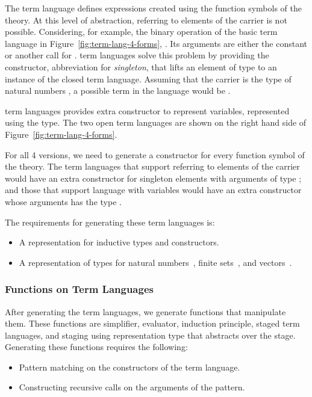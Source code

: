 The  term language defines expressions created using the function symbols of the theory. At this level of abstraction, referring to elements of the carrier is not possible.
Considering, for example, the binary operation of the basic  term language in Figure~\ref{fig:term-lang-4-forms}, . Its arguments are either the constant  or another call for . 
 term languages solve this problem by providing the  constructor, abbreviation for \emph{singleton}, that lifts an element of type  to an instance of the closed term language. Assuming that the carrier is the type of natural numbers , a possible term in the language would be . 

 term languages provides extra constructor to represent variables, represented using the  type. The two open term languages are shown on the right hand side of Figure~\ref{fig:term-lang-4-forms}.  

For all 4 versions, we need to generate a constructor for every function symbol of the theory. The term languages that support referring to elements of the carrier would have an extra constructor for singleton elements with arguments of type ; and those that support language with variables would have an extra constructor whose arguments has the type . 

The requirements for generating these term languages is: 
\begin{itemize}
\item A representation for inductive types and constructors.  
\item A representation of types for natural numbers~, finite sets~, and vectors~. 
\end{itemize}

\subsubsection{Functions on Term Languages}
\label{sec:gen:reqs:funcs}
After generating the term languages, we generate functions that manipulate them. These functions are simplifier, evaluator, induction principle, staged term languages, and staging using representation type that abstracts over the stage. Generating these functions requires the following: 
\begin{itemize}
\item Pattern matching on the constructors of the term language.  
\item Constructing recursive calls on the arguments of the pattern. 
\end{itemize} 

